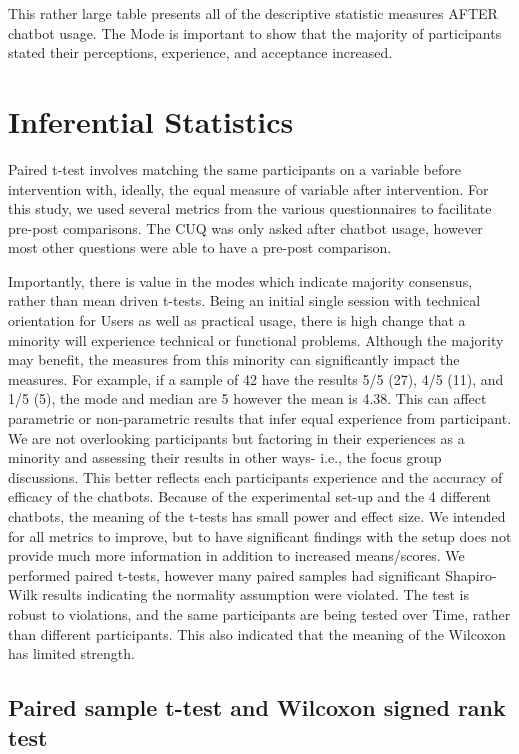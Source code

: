 \documentclass[a4paper, nobind]{templates/ociamthesis}
\begin{document}
This rather large table presents all of the descriptive statistic measures AFTER chatbot usage. The Mode is important to show that the majority of participants stated their perceptions, experience, and acceptance increased.

\hypertarget{inferential-statistics}{%
\section{Inferential Statistics}\label{inferential-statistics}}

Paired t-test involves matching the same participants on a variable before intervention with, ideally, the equal measure of variable after intervention. For this study, we used several metrics from the various questionnaires to facilitate pre-post comparisons. The CUQ was only asked after chatbot usage, however most other questions were able to have a pre-post comparison.

Importantly, there is value in the modes which indicate majority consensus, rather than mean driven t-tests. Being an initial single session with technical orientation for Users as well as practical usage, there is high change that a minority will experience technical or functional problems. Although the majority may benefit, the measures from this minority can significantly impact the measures. For example, if a sample of 42 have the results 5/5 (27), 4/5 (11), and 1/5 (5), the mode and median are 5 however the mean is 4.38. This can affect parametric or non-parametric results that infer equal experience from participant. We are not overlooking participants but factoring in their experiences as a minority and assessing their results in other ways- i.e., the focus group discussions. This better reflects each participants experience and the accuracy of efficacy of the chatbots.
Because of the experimental set-up and the 4 different chatbots, the meaning of the t-tests has small power and effect size. We intended for all metrics to improve, but to have significant findings with the setup does not provide much more information in addition to increased means/scores. We performed paired t-tests, however many paired samples had significant Shapiro-Wilk results indicating the normality assumption were violated. The test is robust to violations, and the same participants are being tested over Time, rather than different participants. This also indicated that the meaning of the Wilcoxon has limited strength.

\hypertarget{paired-sample-t-test-and-wilcoxon-signed-rank-test}{%
\subsection{Paired sample t-test and Wilcoxon signed rank test}\label{paired-sample-t-test-and-wilcoxon-signed-rank-test}}
\end{document}
